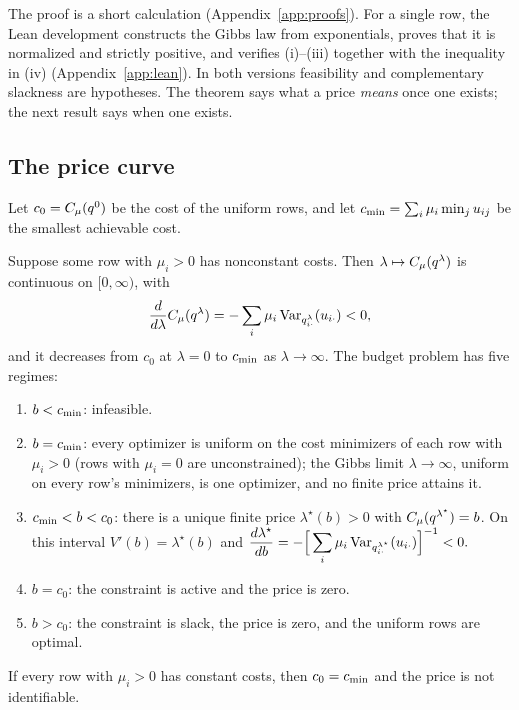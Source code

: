 The proof is a short calculation (Appendix~\ref{app:proofs}). For a single row, the Lean development constructs the Gibbs law from exponentials, proves that it is normalized and strictly positive, and verifies (i)--(iii) together with the inequality in (iv) (Appendix~\ref{app:lean}). In both versions feasibility and complementary slackness are hypotheses. The theorem says what a price \emph{means} once one exists; the next result says when one exists.

\subsection{The price curve}

Let \(c_0=C_{\mu}(q^0)\) be the cost of the uniform rows, and let \(c_{\min}=\sum_i\mu_i\min_ju_{ij}\) be the smallest achievable cost.

\begin{proposition}\label{prop:regimes}
Suppose some row with \(\mu_i>0\) has nonconstant costs. Then \(\lambda\mapsto C_{\mu}(q^\lambda)\) is continuous on \([0,\infty)\), with
\[
\frac{d}{d\lambda}C_{\mu}(q^\lambda)=-\sum_i\mu_i\operatorname{Var}_{q^\lambda_{i\cdot}}(u_{i\cdot})<0,
\]
and it decreases from \(c_0\) at \(\lambda=0\) to \(c_{\min}\) as \(\lambda\to\infty\). The budget problem has five regimes:
\begin{enumerate}[label=(\alph*),leftmargin=*]
\item \(b<c_{\min}\): infeasible.
\item \(b=c_{\min}\): every optimizer is uniform on the cost minimizers of each row with \(\mu_i>0\) (rows with \(\mu_i=0\) are unconstrained); the Gibbs limit \(\lambda\to\infty\), uniform on every row's minimizers, is one optimizer, and no finite price attains it.
\item \(c_{\min}<b<c_0\): there is a unique finite price \(\lambda^\star(b)>0\) with \(C_{\mu}(q^{\lambda^\star})=b\). On this interval \(V'(b)=\lambda^\star(b)\) and
\(\displaystyle\frac{d\lambda^\star}{db}=-\Big[\sum_i\mu_i\operatorname{Var}_{q^{\lambda^\star}_{i\cdot}}(u_{i\cdot})\Big]^{-1}<0.\)
\item \(b=c_0\): the constraint is active and the price is zero.
\item \(b>c_0\): the constraint is slack, the price is zero, and the uniform rows are optimal.
\end{enumerate}
If every row with \(\mu_i>0\) has constant costs, then \(c_0=c_{\min}\) and the price is not identifiable.
\end{proposition}

